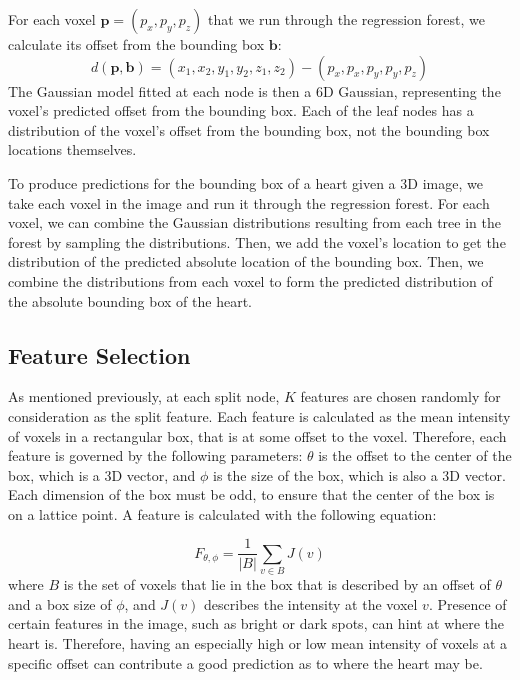 For each voxel $\mathbf{p}=(p_x, p_y, p_z)$ that we run through the regression forest, we calculate its offset from the bounding box $\mathbf{b}$:
\begin{equation}
  d(\mathbf{p}, \mathbf{b}) = (x_1, x_2, y_1, y_2, z_1, z_2) - (p_x, p_x, p_y, p_y, p_z)
\end{equation}
The Gaussian model fitted at each node is then a 6D Gaussian, representing the voxel's predicted offset from the bounding box. Each of the leaf nodes has a distribution of the voxel's offset from the bounding box, not the bounding box locations themselves.

To produce predictions for the bounding box of a heart given a 3D image, we take each voxel in the image and run it through the regression forest. For each voxel, we can combine the Gaussian distributions resulting from each tree in the forest by sampling the distributions. Then, we add the voxel's location to get the distribution of the predicted absolute location of the bounding box. Then, we combine the distributions from each voxel to form the predicted distribution of the absolute bounding box of the heart.

\subsection{Feature Selection}
As mentioned previously, at each split node, $K$ features are chosen randomly for consideration as the split feature. Each feature is calculated as the mean intensity of voxels in a rectangular box, that is at some offset to the voxel. Therefore, each feature is governed by the following parameters: $\theta$ is the offset to the center of the box, which is a 3D vector, and $\phi$ is the size of the box, which is also a 3D vector. Each dimension of the box must be odd, to ensure that the center of the box is on a lattice point. A feature is calculated with the following equation:

\begin{equation}
  F_{\theta, \phi} = \frac{1}{|B|} \sum_{v \in B} J(v)
\end{equation}
where $B$ is the set of voxels that lie in the box that is described by an offset of $\theta$ and a box size of $\phi$, and $J(v)$ describes the intensity at the voxel $v$. Presence of certain features in the image, such as bright or dark spots, can hint at where the heart is. Therefore, having an especially high or low mean intensity of voxels at a specific offset can contribute a good prediction as to where the heart may be.

